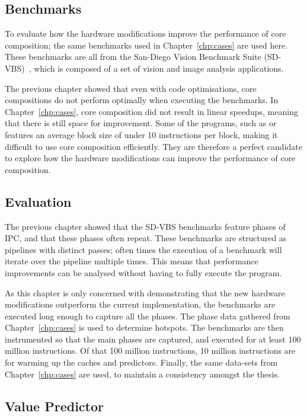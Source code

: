 \subsection{Benchmarks}
To evaluate how the hardware modifications improve the performance of core composition; the same benchmarks used in Chapter~\ref{chp:cases} are used here.
These benchmarks are all from the San-Diego Vision Benchmark Suite (SD-VBS)~\cite{sdvbs}, which is composed of a set of vision and image analysis applications.

The previous chapter showed that even with code optimisations, core compositions do not perform optimally when executing the benchmarks.
In Chapter~\ref{chp:cases}, core composition did not result in linear speedups, meaning that there is still space for improvement.
Some of the programs, such as  or  features an average block size of under 10 instructions per block, making it difficult to use core composition efficiently.
They are therefore a perfect candidate to explore how the hardware modifications can improve the performance of core composition.

\subsection{Evaluation} 
The previous chapter showed that the SD-VBS benchmarks feature phases of IPC, and that these phases often repeat.
These benchmarks are structured as pipelines with distinct passes; often times the execution of a benchmark will iterate over the pipeline multiple times.
This means that performance improvements can be analysed without having to fully execute the program.

As this chapter is only concerned with demonstrating that the new hardware modifications outperform the current implementation, the benchmarks are executed long enough to capture all the phases.
The phase data gathered from Chapter~\ref{chp:cases} is used to determine hotspots.
The benchmarks are then instrumented so that the main phases are captured, and executed for at least 100 million instructions.
Of that 100 million instructions, 10 million instructions are for warming up the caches and predictors.
Finally, the same data-sets from Chapter~\ref{chp:cases} are used, to maintain a consistency amongst the thesis.

\subsection{Value Predictor}


